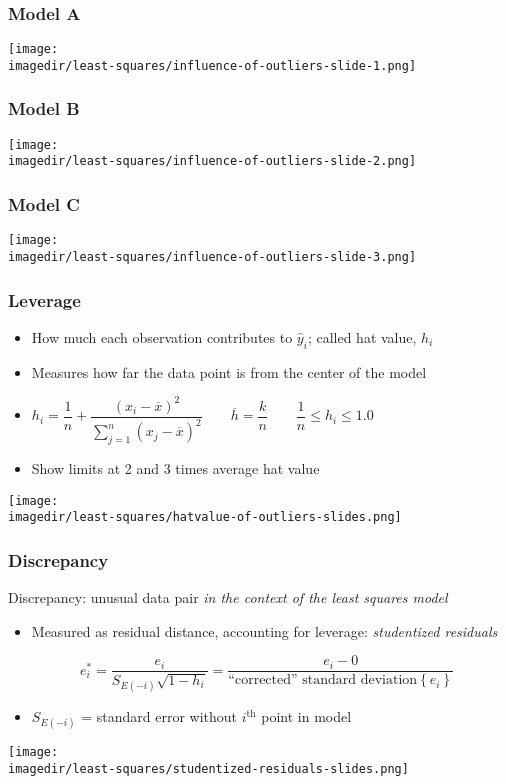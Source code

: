 \begin{frame}\frametitle{Model A}
	\begin{center}
		\texttt{[image: \\imagedir/least-squares/influence-of-outliers-slide-1.png]}
	\end{center}
\end{frame}

\begin{frame}\frametitle{Model B}
	\begin{center}
		\texttt{[image: \\imagedir/least-squares/influence-of-outliers-slide-2.png]}
	\end{center}
\end{frame}

\begin{frame}\frametitle{Model C}
	\begin{center}
		\texttt{[image: \\imagedir/least-squares/influence-of-outliers-slide-3.png]}
	\end{center}
\end{frame}

\begin{frame}\frametitle{Leverage}
	\begin{itemize}
		\item	How much each observation contributes to $\hat{y}_i$; called hat value, $h_i$
		\item	Measures how far the data point is from the center of the model
		\item	$ h_i = \dfrac{1}{n} + \dfrac{\left(x_i -\overline{x}\right)^2}{\sum_{j=1}^{n}{\left(x_j -\overline{x}\right)^2}} \qquad \overline{h} = \dfrac{k}{n} \qquad \dfrac{1}{n} \leq h_i \leq 1.0$
		\item	Show limits at 2 and 3 times average hat value
	\end{itemize}
	\begin{center}
		\texttt{[image: \\imagedir/least-squares/hatvalue-of-outliers-slides.png]}
	\end{center}
\end{frame}

\begin{frame}\frametitle{Discrepancy}

	Discrepancy: unusual data pair \emph{in the context of the least squares model}
	\begin{itemize}
		\item	Measured as residual distance, accounting for leverage: \emph{studentized residuals}
	\end{itemize}
	$$ \quad e_i^* = \dfrac{e_i}{S_{E(-i)}\sqrt{1-h_i}} = \dfrac{e_i - 0}{\text{``corrected'' standard deviation}\left\{e_i \right\}} $$
	\begin{itemize}
		\item	$S_{E(-i)}$ = standard error without $i^\text{th}$ point in model
	\end{itemize}
	\begin{center}
		\texttt{[image: \\imagedir/least-squares/studentized-residuals-slides.png]}
	\end{center}
\end{frame}

